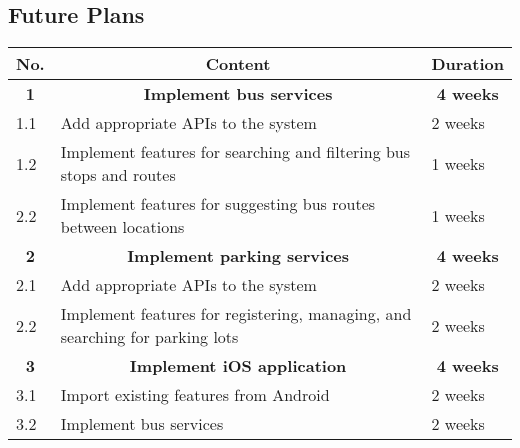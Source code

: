    
\subsection{Future Plans}

\begin{table}[H]
    \centering
    \begin{tabular}{|l|l|l|}
    \hline
    \multicolumn{1}{|c|}{No.} & \multicolumn{1}{c|}{Content}                                                 & \multicolumn{1}{c|}{Duration} \\ \hline
    \multicolumn{1}{|c|}{\textbf{1}} & \multicolumn{1}{c|}{\textbf{Implement bus services}}     & \multicolumn{1}{c|}{\textbf{4 weeks}} \\ \hline
    1.1                       & Add appropriate APIs to the system                                           & 2 weeks                       \\ \hline
    1.2                       & Implement features for searching and filtering bus stops and routes          & 1 weeks                       \\ \hline
    2.2                       & Implement features for suggesting bus routes between locations               & 1 weeks                       \\ \hline
    \multicolumn{1}{|c|}{\textbf{2}} & \multicolumn{1}{c|}{\textbf{Implement parking services}} & \multicolumn{1}{c|}{\textbf{4 weeks}} \\ \hline
    2.1                       & Add appropriate APIs to the system                                           & 2 weeks                       \\ \hline
    2.2                       & Implement features for registering, managing, and searching for parking lots & 2 weeks                       \\ \hline
    \multicolumn{1}{|c|}{\textbf{3}} & \multicolumn{1}{c|}{\textbf{Implement iOS application}}  & \multicolumn{1}{c|}{\textbf{4 weeks}} \\ \hline
    3.1                       & Import existing features from Android                                        & 2 weeks                       \\ \hline
    3.2                       & Implement bus services                                                       & 2 weeks                       \\ \hline
    \end{tabular}
    \end{table}